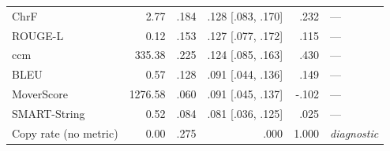 \begin{table}[t]
\begin{tabular}{@{}lrrrrl@{}}
ChrF & 2.77 & .184 & .128 {\scriptsize [.083, .170]} & .232 & --- \\
ROUGE-L & 0.12 & .153 & .127 {\scriptsize [.077, .172]} & .115 & --- \\
ccm & 335.38 & .225 & .124 {\scriptsize [.085, .163]} & .430 & --- \\
BLEU & 0.57 & .128 & .091 {\scriptsize [.044, .136]} & .149 & --- \\
MoverScore & 1276.58 & .060 & .091 {\scriptsize [.045, .137]} & -.102 & --- \\
SMART-String & 0.52 & .084 & .081 {\scriptsize [.036, .125]} & .025 & --- \\
\midrule
Copy rate (no metric) & 0.00 & .275 & .000 & 1.000 & \emph{diagnostic} \\
\bottomrule
\end{tabular}
\end{table}
